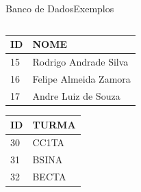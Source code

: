 \documentclass{beamer}
\begin{document}
\begin{frame}[fragile]{Banco de Dados}{Exemplos}
	\begin{columns}
		\begin{column}{0.5\textwidth}
			
			\begin{center}
					\begin{tabular}{ l | l }
						\hline
						\hline
						\hline					
						\rowcolor{header-color} \color{white}\textbf{ID} & \color{white}\textbf{NOME} \\
						\hline
						15 & Rodrigo Andrade Silva\\
						\hline
						16 & Felipe Almeida Zamora\\
						\hline
						17 & Andre Luiz de Souza\\
						\hline
						\hline
					\end{tabular}%
				
					\begin{tabular}{ l | l }
						\hline
						\hline
						\hline					
						\rowcolor{header-color} \color{white}\textbf{ID} & \color{white}\textbf{TURMA} \\
						\hline
						30 & CC1TA\\
						\hline
						31 & BSINA\\
						\hline
						32 & BECTA\\
						\hline
						\hline
					\end{tabular}%
				
			\end{center}
			
		\end{column}
	

\end{columns}
\end{frame}
\end{document}
